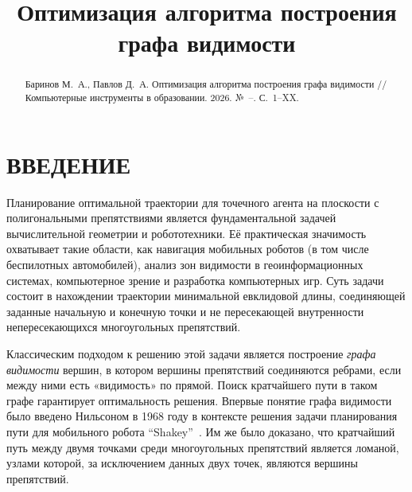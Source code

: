 \documentclass[intlimits,twoside,a4paper,11pt]{article}
\title[Оптимизация графа видимости]{Оптимизация алгоритма построения графа видимости}
\affiliation{1}{Санкт-Петербургский государственный электротехнический университет «ЛЭТИ»,
  ул. Профессора Попова, 5, 197022, Санкт-Петербург, Россия}
\theoremstyle{definition}
\begin{document}

\russianversion

\maketitle

\pagestyle{mainstyle}

\begin{abstract}
    \insertabstract
    \insertkeywords
    \citationexample Баринов М.~А., Павлов Д.~А. Оптимизация алгоритма построения графа видимости // Компьютерные инструменты в образовании. 2026. №~--. С.~1--XX.
\end{abstract}

\section{ВВЕДЕНИЕ}

Планирование оптимальной траектории для точечного агента на плоскости с полигональными препятствиями
является фундаментальной задачей вычислительной геометрии и робототехники.
Её практическая значимость охватывает такие области, как навигация мобильных роботов (в том числе беспилотных автомобилей),
анализ зон видимости в геоинформационных системах, компьютерное зрение и разработка компьютерных игр.
Суть задачи состоит в нахождении траектории минимальной евклидовой длины, соединяющей заданные начальную
и конечную точки и не пересекающей внутренности непересекающихся многоугольных препятствий.

Классическим подходом к решению этой задачи является построение \textit{графа видимости} вершин,
в котором вершины препятствий соединяются ребрами, если между ними есть «видимость» по прямой.
Поиск кратчайшего пути в таком графе гарантирует оптимальность решения.
Впервые понятие графа видимости было введено Нильсоном в 1968 году в контексте 
решения задачи планирования пути для мобильного робота ``Shakey''~\cite{nilsson69}.
Им же было доказано, что кратчайший путь между двумя точками среди многоугольных 
препятствий является ломаной, узлами которой, за исключением данных двух точек,
являются вершины препятствий.
\end{document}
